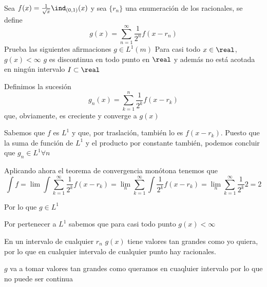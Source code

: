 \begin{problem}[14]
Sea $f(x) = \frac{1}{\sqrt{x}}\ind_{(0,1)}(x)$ y sea $\{r_n\}$ una enumeración de los racionales, se define
\[g(x)=\sum_{n=1}^{\infty}\frac{1}{2^n}f(x-r_n)\]
Prueba las siguientes afirmaciones
\ppart $g \in L^1(m)$
\ppart Para casi todo $x \in \real$, $g(x) < \infty$
\ppart $g$ es discontinua en todo punto en $\real$ y además no está acotada en ningún intervalo $I \subset \real$

\solution
\spart
Definimos la sucesión
\[g_n(x) = \sum_{k=1}^{n} \frac{1}{2^k}f(x-r_k)\]
que, obviamente, es creciente y converge a $g(x)$

Sabemos que $f$ es $L^1$ y que, por traslación, también lo es $f(x-r_k)$. Puesto que la suma de función de $L^1$ y el producto por constante también, podemos concluir que $g_n \in L^1 \forall n$

Aplicando ahora el teorema de convergencia monótona tenemos que
\[\int f = \lim \int \sum_{k=1}^{\infty} \frac{1}{2^k}f(x-r_k) = \lim_n  \sum_{k=1}^{\infty} \int \frac{1}{2^k}f(x-r_k) =\lim_n  \sum_{k=1}^{\infty}\frac{1}{2^k} 2 = 2\]

Por lo que $g \in L^1$

\spart
Por pertenecer a $L^1$ sabemos que para casi todo punto $g(x) < \infty$

\spart

En un intervalo de cualquier $r_n$ $g(x)$ tiene valores tan grandes como yo quiera, por lo que en cualquier intervalo de cualquier punto hay racionales.

$g$ va a tomar valores tan grandes como queramos en cuaqluier intervalo por lo que no puede ser continua
\end{problem}

